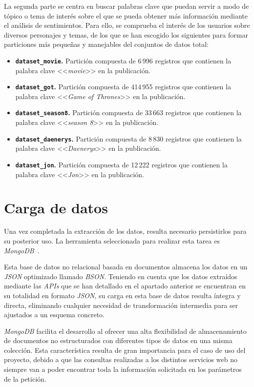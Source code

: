 La segunda parte se centra en buscar palabras clave que puedan servir a modo de tópico o tema de interés sobre el que se pueda obtener más información mediante el análisis de sentimientos. Para ello, se comprueba el interés de los usuarios sobre diversos personajes y temas, de los que se han escogido los siguientes para formar particiones más pequeñas y manejables del conjuntos de datos total:

\begin{itemize}
    \item \textbf{\texttt{dataset\_movie}.} Partición compuesta de 6\,996 registros que contienen la palabra clave <<\textit{movie}>> en la publicación.
    \item \textbf{\texttt{dataset\_got}.} Partición compuesta de 414\,955 registros que contienen la palabra clave <<\textit{Game of Thrones}>> en la publicación.
    \item \textbf{\texttt{dataset\_season8}.} Partición compuesta de 33\,663 registros que contienen la palabra clave <<\textit{season 8}>> en la publicación.
    \item \textbf{\texttt{dataset\_daenerys}.} Partición compuesta de 8\,830 registros que contienen la palabra clave <<\textit{Daenerys}>> en la publicación.
    \item \textbf{\texttt{dataset\_jon}.} Partición compuesta de 12\,222 registros que contienen la palabra clave <<\textit{Jon}>> en la publicación.
\end{itemize}

\section{Carga de datos}

Una vez completada la extracción de los datos, resulta necesario persistirlos para su posterior uso. La herramienta seleccionada para realizar esta tarea es \textit{MongoDB}~\cite{mongodbArchitecture}.

Esta base de datos no relacional basada en documentos almacena los datos en un \textit{JSON} optimizado llamado \textit{BSON}. Teniendo en cuenta que los datos extraídos mediante las \textit{APIs} que se han detallado en el apartado anterior se encuentran en su totalidad en formato \textit{JSON}, su carga en esta base de datos resulta íntegra y directa, eliminando cualquier necesidad de transformación intermedia para ser ajustados a un esquema concreto.

\textit{MongoDB} facilita el desarrollo al ofrecer una alta flexibilidad de almacenamiento de documentos no estructurados con diferentes tipos de datos en una misma colección. Esta característica resulta de gran importancia para el caso de uso del proyecto, debido a que las consultas realizadas a los distintos servicios web no siempre van a poder encontrar toda la información solicitada en los parámetros de la petición.

